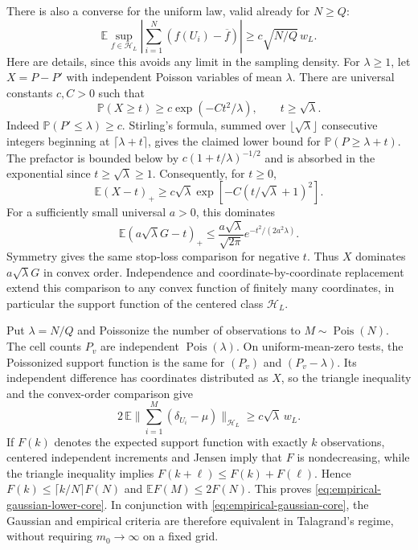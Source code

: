 \documentclass[11pt]{article}
\numberwithin{equation}{section}
\begin{document}
There is also a converse for the uniform law, valid already for $N\ge Q$:
\begin{equation}\label{eq:empirical-gaussian-lower-core}
 \mathbb E\sup_{f\in\mathcal H_L}
 \left|\sum_{i=1}^N(f(U_i)-\overline f)\right|
 \ge c\sqrt{N/Q}\,w_L.
\end{equation}
Here are details, since this avoids any limit in the sampling density.
For $\lambda\ge1$, let $X=P-P'$ with independent Poisson variables of
mean $\lambda$. There are universal constants $c,C>0$ such that
\[
 \mathbb P(X\ge t)\ge c\exp(-Ct^2/\lambda),\qquad t\ge\sqrt\lambda.
\]
Indeed $\mathbb P(P'\le\lambda)\ge c$. Stirling's formula, summed over
$\lfloor\sqrt\lambda\rfloor$ consecutive integers beginning at
$\lceil\lambda+t\rceil$, gives the claimed lower bound for
$\mathbb P(P\ge\lambda+t)$. The prefactor is bounded below by
$c(1+t/\lambda)^{-1/2}$ and is absorbed in the exponential since
$t\ge\sqrt\lambda\ge1$. Consequently, for $t\ge0$,
\[
 \mathbb E(X-t)_+\ge c\sqrt\lambda
                    \exp[-C(t/\sqrt\lambda+1)^2].
\]
For a sufficiently small universal $a>0$, this dominates
\[
 \mathbb E(a\sqrt\lambda G-t)_+
 \le\frac{a\sqrt\lambda}{\sqrt{2\pi}}
                         e^{-t^2/(2a^2\lambda)}.
\]
Symmetry gives the same stop-loss comparison for negative $t$.
Thus $X$ dominates $a\sqrt\lambda G$ in convex order. Independence
and coordinate-by-coordinate replacement extend this comparison to
any convex function of finitely many coordinates, in particular the
support function of the centered class $\mathcal H_L$.

Put $\lambda=N/Q$ and Poissonize the number of observations to
$M\sim\operatorname{Pois}(N)$. The cell counts $P_v$ are independent
$\operatorname{Pois}(\lambda)$. On uniform-mean-zero tests, the
Poissonized support function is the same for $(P_v)$ and
$(P_v-\lambda)$. Its independent difference has coordinates distributed
as $X$, so the triangle inequality and the convex-order comparison give
\[
 2\,\mathbb E\Big\|\sum_{i=1}^{M}(\delta_{U_i}-\mu)\Big\|_{\mathcal H_L}
 \ge c\sqrt\lambda\,w_L.
\]
If $F(k)$ denotes the expected support function with exactly $k$
observations, centered independent increments and Jensen imply that
$F$ is nondecreasing, while the triangle inequality implies
$F(k+\ell)\le F(k)+F(\ell)$. Hence
$F(k)\le\lceil k/N\rceil F(N)$ and
$\mathbb EF(M)\le2F(N)$. This proves
\eqref{eq:empirical-gaussian-lower-core}. In conjunction with
\eqref{eq:empirical-gaussian-core}, the Gaussian and empirical criteria
are therefore equivalent in Talagrand's regime, without requiring
$m_0\to\infty$ on a fixed grid.
\end{document}
